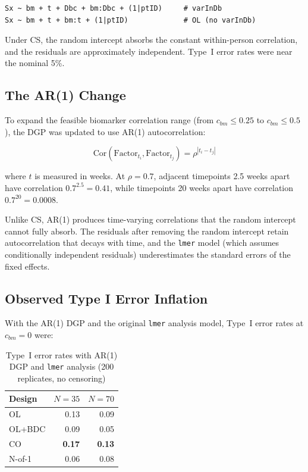 \documentclass[11pt]{article}
\begin{document}
\begin{verbatim}
Sx ~ bm + t + Dbc + bm:Dbc + (1|ptID)     # varInDb
Sx ~ bm + t + bm:t + (1|ptID)             # OL (no varInDb)
\end{verbatim}

Under CS, the random intercept absorbs the constant
within-person correlation, and the residuals are approximately
independent. Type~I error rates were near the nominal 5\%.

\subsection{The AR(1) Change}

To expand the feasible biomarker correlation range (from
$c_{bm} \leq 0.25$ to $c_{bm} \leq 0.5$), the DGP was
updated to use AR(1) autocorrelation:

\[
\text{Cor}(\text{Factor}_{t_i}, \text{Factor}_{t_j}) =
\rho^{|t_i - t_j|}
\]

where $t$ is measured in weeks. At $\rho = 0.7$, adjacent
timepoints 2.5 weeks apart have correlation
$0.7^{2.5} = 0.41$, while timepoints 20 weeks apart have
correlation $0.7^{20} = 0.0008$.

Unlike CS, AR(1) produces time-varying correlations that the
random intercept cannot fully absorb. The residuals after
removing the random intercept retain autocorrelation that
decays with time, and the \texttt{lmer} model (which assumes
conditionally independent residuals) underestimates the
standard errors of the fixed effects.

\subsection{Observed Type I Error Inflation}

With the AR(1) DGP and the original \texttt{lmer} analysis
model, Type~I error rates at $c_{bm} = 0$ were:

\begin{table}[h]
\centering
\caption{Type~I error rates with AR(1) DGP and \texttt{lmer}
  analysis (200 replicates, no censoring)}
\begin{tabular}{lrr}
\toprule
Design & $N = 35$ & $N = 70$ \\
\midrule
OL & 0.13 & 0.09 \\
OL+BDC & 0.09 & 0.05 \\
CO & \textbf{0.17} & \textbf{0.13} \\
N-of-1 & 0.06 & 0.08 \\
\bottomrule
\end{tabular}
\end{table}
\end{document}

